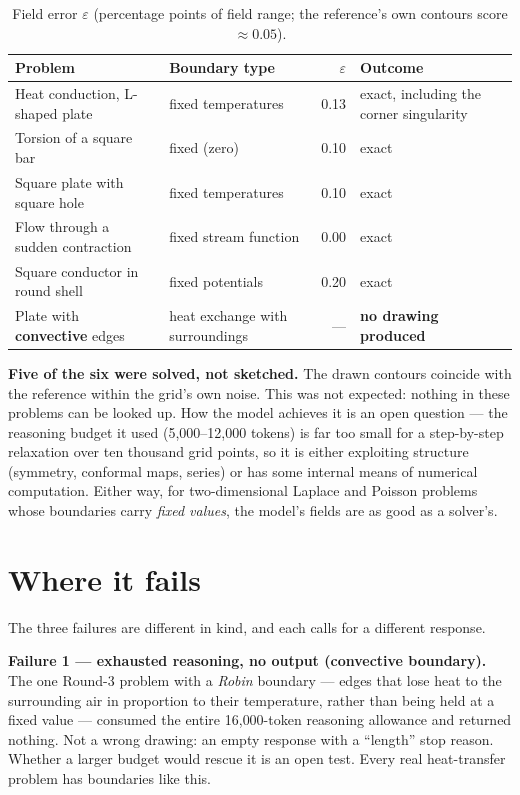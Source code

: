 \documentclass[11pt,a4paper]{article}
\begin{document}
\begin{table}[h]
\centering\small
\begin{tabular}{p{5.2cm}p{3.4cm}rp{5.2cm}}
\toprule
Problem & Boundary type & $\varepsilon$ & Outcome \\
\midrule
Heat conduction, L-shaped plate & fixed temperatures & 0.13 & exact, including the corner singularity \\
Torsion of a square bar & fixed (zero) & 0.10 & exact \\
Square plate with square hole & fixed temperatures & 0.10 & exact \\
Flow through a sudden contraction & fixed stream function & 0.00 & exact \\
Square conductor in round shell & fixed potentials & 0.20 & exact \\
\midrule
Plate with \textbf{convective} edges & heat exchange with surroundings & --- & \textbf{no drawing produced} \\
\bottomrule
\end{tabular}
\caption{Field error $\varepsilon$ (percentage points of field range; the reference's own contours score $\approx0.05$).}
\label{tab:eps}
\end{table}

\begin{goodbox}
\textbf{Five of the six were solved, not sketched.} The drawn contours coincide with the reference within the grid's own noise. This was not expected: nothing in these problems can be looked up. How the model achieves it is an open question --- the reasoning budget it used (5{,}000--12{,}000 tokens) is far too small for a step-by-step relaxation over ten thousand grid points, so it is either exploiting structure (symmetry, conformal maps, series) or has some internal means of numerical computation. Either way, for two-dimensional Laplace and Poisson problems whose boundaries carry \emph{fixed values}, the model's fields are as good as a solver's.
\end{goodbox}

\section{Where it fails}\label{sec:fail}
The three failures are different in kind, and each calls for a different response.

\begin{badbox}
\textbf{Failure 1 --- exhausted reasoning, no output (convective boundary).}\\
The one Round-3 problem with a \emph{Robin} boundary --- edges that lose heat to the surrounding air in proportion to their temperature, rather than being held at a fixed value --- consumed the entire 16{,}000-token reasoning allowance and returned nothing. Not a wrong drawing: an empty response with a ``length'' stop reason. Whether a larger budget would rescue it is an open test. Every real heat-transfer problem has boundaries like this.
\end{badbox}
\end{document}
